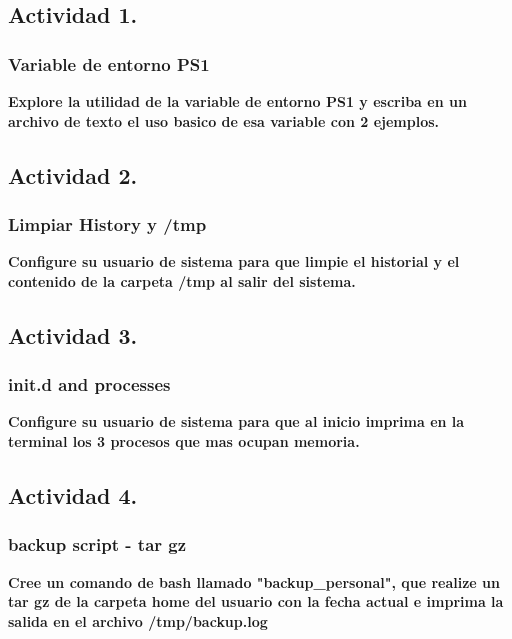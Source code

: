 \documentclass[a4paper,11pt,spanish]{article} %
\begin{document}
\subsection{Actividad 1.}

\subsubsection{Variable de entorno PS1}

\textbf{Explore la utilidad de la variable de entorno PS1 y escriba en un archivo de texto
el uso basico de esa variable con 2 ejemplos.}\\

\subsection{Actividad 2.}

\subsubsection{Limpiar History y /tmp}

\textbf{Configure su usuario de sistema para que limpie el historial y el contenido
de la carpeta /tmp al salir del sistema.}\\

\subsection{Actividad 3.}

\subsubsection{init.d and processes}

\textbf{Configure su usuario de sistema para que al inicio imprima en la terminal
los 3 procesos que mas ocupan memoria.}

\subsection{Actividad 4.}

\subsubsection{backup script - tar gz}

\textbf{Cree un comando de bash llamado "backup\_personal", que realize un tar gz de la
carpeta home del usuario con la fecha actual e imprima la salida en el archivo /tmp/backup.log }
\end{document}
